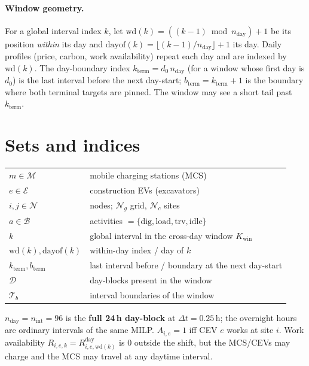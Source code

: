 \documentclass[11pt]{article}
\newcommand{\dt}{\Delta t}
\begin{document}
\paragraph{Window geometry.} For a global interval index $k$, let
$\mathrm{wd}(k)=((k-1)\bmod n_{\text{day}})+1$ be its position \emph{within} its day and
$\mathrm{dayof}(k)=\lfloor(k-1)/n_{\text{day}}\rfloor+1$ its day. Daily profiles (price,
carbon, work availability) repeat each day and are indexed by $\mathrm{wd}(k)$. The
day-boundary index $k_{\text{term}}=d_0\,n_{\text{day}}$ (for a window whose first day is $d_0$)
is the last interval before the next day-start; $b_{\text{term}}=k_{\text{term}}+1$ is the boundary
where both terminal targets are pinned. The window may see a short tail past $k_{\text{term}}$.

\section{Sets and indices}
\label{sec:sets}
\begin{tabular}{ll}
$m \in \mathcal{M}$ & mobile charging stations (MCS) \\
$e \in \mathcal{E}$ & construction EVs (excavators) \\
$i,j \in \mathcal{N}$ & nodes; $\mathcal{N}_g$ grid, $\mathcal{N}_c$ sites \\
$a \in \mathcal{B}$ & activities $=\{\text{dig},\text{load},\text{trv},\text{idle}\}$ \\
$k$ & global interval in the cross-day window $K_{\text{win}}$ \\
$\mathrm{wd}(k),\mathrm{dayof}(k)$ & within-day index / day of $k$ \\
$k_{\text{term}},b_{\text{term}}$ & last interval before / boundary at the next day-start \\
$\mathcal{D}$ & day-blocks present in the window \\
$\mathcal{T}_b$ & interval boundaries of the window \\
\end{tabular}

\medskip
$n_{\text{day}}=n_{\text{int}}=96$ is the \textbf{full 24\,h day-block} at $\dt=0.25$\,h;
the overnight hours are ordinary intervals of the same MILP. $A_{i,e}=1$
iff CEV $e$ works at site $i$. Work availability $R_{i,e,k}=R^{\text{day}}_{i,e,\mathrm{wd}(k)}$
is $0$ outside the shift, but the MCS/CEVs may charge and the MCS may travel at any
daytime interval.
\end{document}
